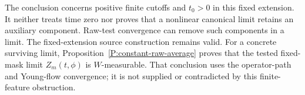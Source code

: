 

The conclusion concerns positive finite cutoffs and $t_0>0$ in this fixed
extension. It neither treats time zero nor proves that a nonlinear canonical
limit retains an auxiliary component. Raw-test convergence can remove such
components in a limit. The fixed-extension source construction remains valid.
For a concrete surviving limit, Proposition~\ref{P:constant-raw-average}
proves that the tested fixed-mask limit $Z_m(t,\phi)$ is $W$-measurable.
That conclusion uses the operator-path and Young-flow convergence; it is not
supplied or contradicted by this finite-feature obstruction.
